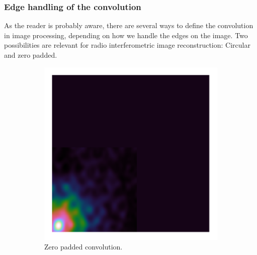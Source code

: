 \subsubsection{Edge handling of the convolution}
As the reader is probably aware, there are several ways to define the convolution in image processing, depending on how we handle the edges on the image. Two possibilities are relevant for radio interferometric image reconstruction: Circular and zero padded.

\begin{figure}[h]
	\centering
	\begin{subfigure}[b]{0.3\linewidth}
		\includegraphics[width=\linewidth, clip, trim= 0.125in 0.125in 0.125in 0.125in]{./chapters/03.cd/simulated/psfZeroPadding.png}
		\caption{Zero padded convolution.}
		\label{cd:efficient:convolution:padded}
	\end{subfigure}
	\begin{subfigure}[b]{0.3\linewidth}

\end{subfigure}
\end{figure}
